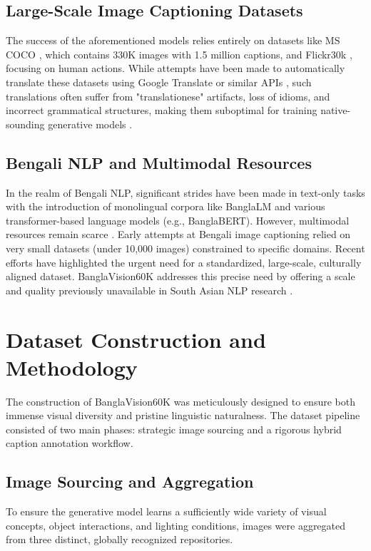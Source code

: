 \documentclass[conference]{IEEEtran}
\begin{document}
\subsection{Large-Scale Image Captioning Datasets}
The success of the aforementioned models relies entirely on datasets like MS COCO \cite{lin2014microsoft}, which contains 330K images with 1.5 million captions, and Flickr30k \cite{young2014image}, focusing on human actions. While attempts have been made to automatically translate these datasets using Google Translate or similar APIs \cite{karim2025evaluating}, such translations often suffer from "translationese" artifacts, loss of idioms, and incorrect grammatical structures, making them suboptimal for training native-sounding generative models \cite{sarker2024data}.

\subsection{Bengali NLP and Multimodal Resources}
In the realm of Bengali NLP, significant strides have been made in text-only tasks with the introduction of monolingual corpora like BanglaLM and various transformer-based language models (e.g., BanglaBERT). However, multimodal resources remain scarce \cite{hossain2023bengali}. Early attempts at Bengali image captioning \cite{das2023captioning} relied on very small datasets (under 10,000 images) constrained to specific domains. Recent efforts \cite{ahmed2024multimodal, khatun2024benchmarking} have highlighted the urgent need for a standardized, large-scale, culturally aligned dataset. BanglaVision60K addresses this precise need by offering a scale and quality previously unavailable in South Asian NLP research \cite{rahman2024vision, islam2025generative}.

\section{Dataset Construction and Methodology}
The construction of BanglaVision60K was meticulously designed to ensure both immense visual diversity and pristine linguistic naturalness. The dataset pipeline consisted of two main phases: strategic image sourcing and a rigorous hybrid caption annotation workflow.

\subsection{Image Sourcing and Aggregation}
To ensure the generative model learns a sufficiently wide variety of visual concepts, object interactions, and lighting conditions, images were aggregated from three distinct, globally recognized repositories. 
\end{document}
